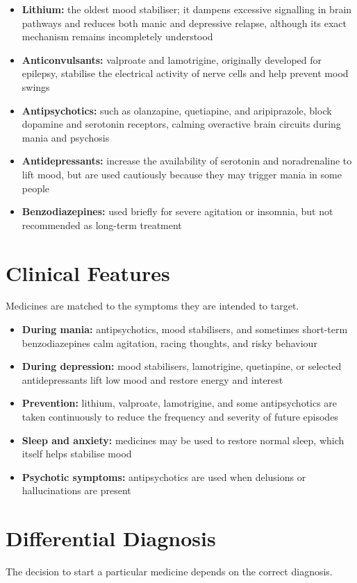 \begin{itemize}
    \item \textbf{Lithium:} the oldest mood stabiliser; it dampens excessive signalling in brain pathways and reduces both manic and depressive relapse, although its exact mechanism remains incompletely understood
    \item \textbf{Anticonvulsants:} valproate and lamotrigine, originally developed for epilepsy, stabilise the electrical activity of nerve cells and help prevent mood swings
    \item \textbf{Antipsychotics:} such as olanzapine, quetiapine, and aripiprazole, block dopamine and serotonin receptors, calming overactive brain circuits during mania and psychosis
    \item \textbf{Antidepressants:} increase the availability of serotonin and noradrenaline to lift mood, but are used cautiously because they may trigger mania in some people
    \item \textbf{Benzodiazepines:} used briefly for severe agitation or insomnia, but not recommended as long-term treatment
\end{itemize}

\section*{Clinical Features}
Medicines are matched to the symptoms they are intended to target.

\begin{itemize}
    \item \textbf{During mania:} antipsychotics, mood stabilisers, and sometimes short-term benzodiazepines calm agitation, racing thoughts, and risky behaviour
    \item \textbf{During depression:} mood stabilisers, lamotrigine, quetiapine, or selected antidepressants lift low mood and restore energy and interest
    \item \textbf{Prevention:} lithium, valproate, lamotrigine, and some antipsychotics are taken continuously to reduce the frequency and severity of future episodes
    \item \textbf{Sleep and anxiety:} medicines may be used to restore normal sleep, which itself helps stabilise mood
    \item \textbf{Psychotic symptoms:} antipsychotics are used when delusions or hallucinations are present
\end{itemize}

\section*{Differential Diagnosis}
The decision to start a particular medicine depends on the correct diagnosis.

